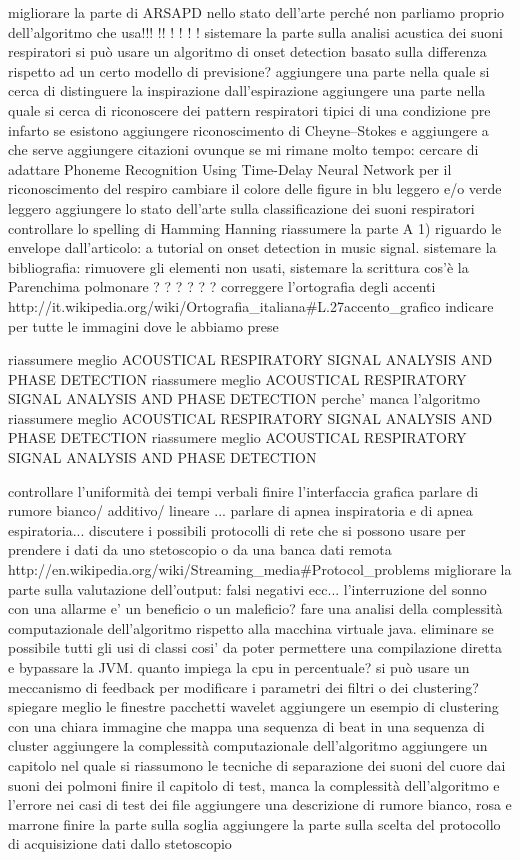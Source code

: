migliorare la parte di ARSAPD nello stato dell'arte perché non parliamo proprio dell'algoritmo che usa!!! !! ! ! ! ! 
sistemare la parte sulla analisi acustica dei suoni respiratori
si può usare un algoritmo di onset detection basato sulla differenza rispetto ad un certo modello di previsione?
aggiungere una parte nella quale si cerca di distinguere la inspirazione dall'espirazione
aggiungere una parte nella quale si cerca di riconoscere dei pattern respiratori tipici di una condizione pre infarto se esistono
aggiungere riconoscimento di Cheyne–Stokes e aggiungere a che serve
aggiungere citazioni ovunque
se mi rimane molto tempo: cercare di adattare Phoneme Recognition Using Time-Delay Neural Network per il riconoscimento del respiro
cambiare il colore delle figure in blu leggero e/o verde leggero
aggiungere lo stato dell'arte sulla classificazione dei suoni respiratori
controllare lo spelling di Hamming Hanning
riassumere la parte A 1) riguardo le envelope dall'articolo: a tutorial on onset detection in music signal.
sistemare la bibliografia: rimuovere gli elementi non usati, sistemare la scrittura
cos'è la Parenchima polmonare ?  ? ? ? ? ?
correggere l'ortografia degli accenti 
http://it.wikipedia.org/wiki/Ortografia_italiana#L.27accento_grafico
indicare per tutte le immagini dove le abbiamo prese


riassumere meglio ACOUSTICAL RESPIRATORY SIGNAL ANALYSIS AND PHASE DETECTION
riassumere meglio ACOUSTICAL RESPIRATORY SIGNAL ANALYSIS AND PHASE DETECTION
perche' manca l'algoritmo
riassumere meglio ACOUSTICAL RESPIRATORY SIGNAL ANALYSIS AND PHASE DETECTION
riassumere meglio ACOUSTICAL RESPIRATORY SIGNAL ANALYSIS AND PHASE DETECTION



controllare l'uniformità dei tempi verbali
finire l'interfaccia grafica
parlare di rumore bianco/ additivo/ lineare ...
parlare di apnea inspiratoria e di apnea espiratoria...
discutere i possibili protocolli di rete che si possono usare per prendere i dati da uno stetoscopio o da una banca dati remota
http://en.wikipedia.org/wiki/Streaming_media#Protocol_problems
migliorare la parte sulla valutazione dell'output: falsi negativi ecc...
l'interruzione del sonno con una allarme e' un beneficio o un maleficio?
fare una analisi della complessità computazionale dell'algoritmo rispetto alla macchina virtuale java.
eliminare se possibile tutti gli usi di classi cosi' da poter permettere una compilazione diretta e bypassare la JVM.
quanto impiega la cpu in percentuale? 
si può usare un meccanismo di feedback per modificare i parametri dei filtri o dei clustering?
spiegare meglio le finestre
pacchetti wavelet
aggiungere un esempio di clustering con una chiara immagine che mappa una sequenza di beat in una sequenza di cluster
aggiungere la complessità computazionale dell'algoritmo
aggiungere un capitolo nel quale si riassumono le tecniche di separazione dei suoni del cuore dai suoni dei polmoni
finire il capitolo di test, manca la complessità dell'algoritmo e l'errore nei casi di test dei file
aggiungere una descrizione di rumore bianco, rosa e marrone
finire la parte sulla soglia 
aggiungere la parte sulla scelta del protocollo di acquisizione dati dallo stetoscopio